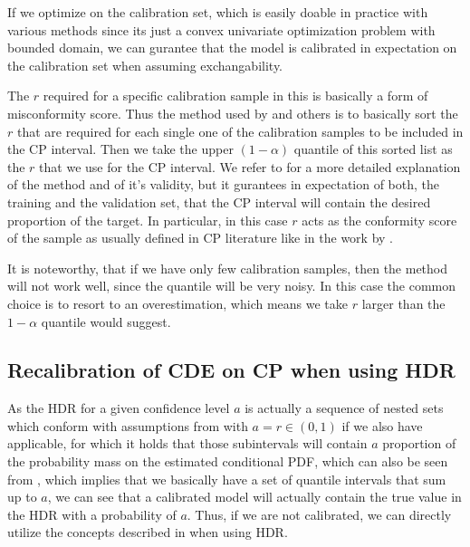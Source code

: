 If we optimize  on the calibration set, which is easily doable in practice with various methods since its just a convex univariate optimization problem with bounded domain, we can gurantee that the model is calibrated in expectation on the calibration set when assuming exchangability.

The $r$ required for a specific calibration sample in this  is basically a form of misconformity score. Thus the method used by \cite{sesia2021conformal, chernozhukov2021distributional} and others is to basically sort the $r$ that are required for each single one of the calibration samples to be included in the CP interval. Then we take the upper $(1- \alpha)$ quantile of this sorted list as the $r$ that we use for the CP interval. We refer to \cite{sesia2021conformal} for a more detailed explanation of the method and of it's validity, but it gurantees in expectation of both, the training and the validation set, that the CP interval will contain the desired proportion of the target. In particular, in this case $r$ acts as the conformity score of the sample as usually defined in CP literature like in the work by \cite{sesia2021conformal}.

It is noteworthy, that if we have only few calibration samples, then the method will not work well, since the quantile will be very noisy. In this case the common choice is to resort to an overestimation, which means we take $r$ larger than the $1-\alpha$ quantile would suggest.

\subsection{Recalibration of CDE on CP when using HDR}\label{sec:cp_sub_cde_hrd}

As the HDR for a given confidence level $a$ is actually a sequence of nested sets which conform with assumptions from  with $a = r \in (0,1)$ if we also have  applicable, for which it holds that those subintervals will contain $a$ proportion of the probability mass on the estimated conditional PDF, which can also be seen from , which implies that we basically have a set of quantile intervals that sum up to $a$, we can see that a calibrated model will actually contain the true value in the HDR with a probability of $a$. Thus, if we are not calibrated, we can directly utilize the concepts described in  when using HDR. 

